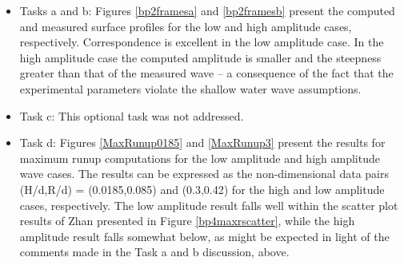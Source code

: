 \begin{itemize}
\item Tasks a and b:
Figures \ref{bp2framesa} and \ref{bp2framesb} present the computed and measured surface profiles for the low and high amplitude cases, respectively.  Correspondence is excellent in the low amplitude case.  In the high amplitude case the computed amplitude is smaller and the steepness greater than that of the measured wave -- a consequence of the fact that the experimental parameters violate the shallow water wave assumptions.
\item Task c: This optional task was not addressed.
\item Task d:  Figures \ref{MaxRunup0185} and \ref{MaxRunup3} present the results for maximum runup computations for the low amplitude and high amplitude wave cases.  The results can be expressed as the non-dimensional data pairs (H/d,R/d) = (0.0185,0.085) and (0.3,0.42) for the high and low amplitude cases, respectively.  The low amplitude result falls well within the scatter plot results of Zhan \cite{bp-description} presented in Figure \ref{bp4maxrscatter}, while the high amplitude result falls somewhat below, as might be expected in light of the comments made in the Task a and b discussion, above.
\end{itemize}

